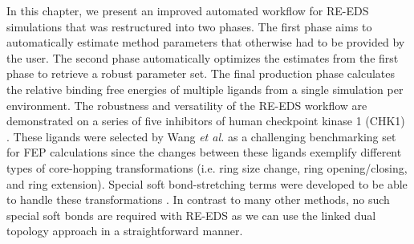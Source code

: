 In this chapter, we present an improved automated workflow for RE-EDS simulations that was restructured into two phases. The first phase aims to automatically estimate method parameters that otherwise had to be provided by the user. The second phase automatically optimizes the estimates from the first phase to retrieve a robust parameter set. The final production phase calculates the relative binding free energies of multiple ligands from a single simulation per environment. 
The robustness and versatility of the RE-EDS workflow are demonstrated on a series of five inhibitors of human checkpoint kinase 1 (CHK1) \cite{Huang2012}.
These ligands were selected by Wang \textit{et al.} \cite{Wang2017} as a challenging benchmarking set for FEP calculations since the changes between these ligands exemplify different types of core-hopping transformations (i.e. ring size change, ring opening/closing, and ring extension). Special soft bond-stretching terms were developed to be able to handle these transformations \cite{Wang2017}. In contrast to many other methods, no such special soft bonds are required with RE-EDS as we can use the linked dual topology approach \cite{Riniker2011} in a straightforward manner. 
\FloatBarrier